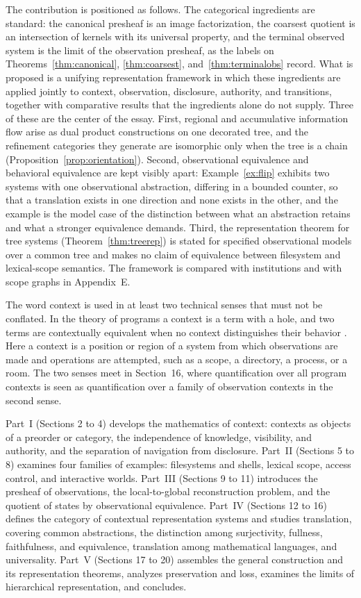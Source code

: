 The contribution is positioned as follows. The categorical ingredients are standard: the canonical presheaf is an image factorization, the coarsest quotient is an intersection of kernels with its universal property, and the terminal observed system is the limit of the observation presheaf, as the labels on Theorems~\ref{thm:canonical}, \ref{thm:coarsest}, and~\ref{thm:terminalobs} record. What is proposed is a unifying representation framework in which these ingredients are applied jointly to context, observation, disclosure, authority, and transitions, together with comparative results that the ingredients alone do not supply. Three of these are the center of the essay. First, regional and accumulative information flow arise as dual product constructions on one decorated tree, and the refinement categories they generate are isomorphic only when the tree is a chain (Proposition~\ref{prop:orientation}). Second, observational equivalence and behavioral equivalence are kept visibly apart: Example~\ref{ex:flip} exhibits two systems with one observational abstraction, differing in a bounded counter, so that a translation exists in one direction and none exists in the other, and the example is the model case of the distinction between what an abstraction retains and what a stronger equivalence demands. Third, the representation theorem for tree systems (Theorem~\ref{thm:treerep}) is stated for specified observational models over a common tree and makes no claim of equivalence between filesystem and lexical-scope semantics. The framework is compared with institutions and with scope graphs in Appendix~E.

The word context is used in at least two technical senses that must not be conflated. In the theory of programs a context is a term with a hole, and two terms are contextually equivalent when no context distinguishes their behavior \cite{morris}. Here a context is a position or region of a system from which observations are made and operations are attempted, such as a scope, a directory, a process, or a room. The two senses meet in Section~16, where quantification over all program contexts is seen as quantification over a family of observation contexts in the second sense.

Part~I (Sections 2 to 4) develops the mathematics of context: contexts as objects of a preorder or category, the independence of knowledge, visibility, and authority, and the separation of navigation from disclosure. Part~II (Sections 5 to 8) examines four families of examples: filesystems and shells, lexical scope, access control, and interactive worlds. Part~III (Sections 9 to 11) introduces the presheaf of observations, the local-to-global reconstruction problem, and the quotient of states by observational equivalence. Part~IV (Sections 12 to 16) defines the category of contextual representation systems and studies translation, covering common abstractions, the distinction among surjectivity, fullness, faithfulness, and equivalence, translation among mathematical languages, and universality. Part~V (Sections 17 to 20) assembles the general construction and its representation theorems, analyzes preservation and loss, examines the limits of hierarchical representation, and concludes.


